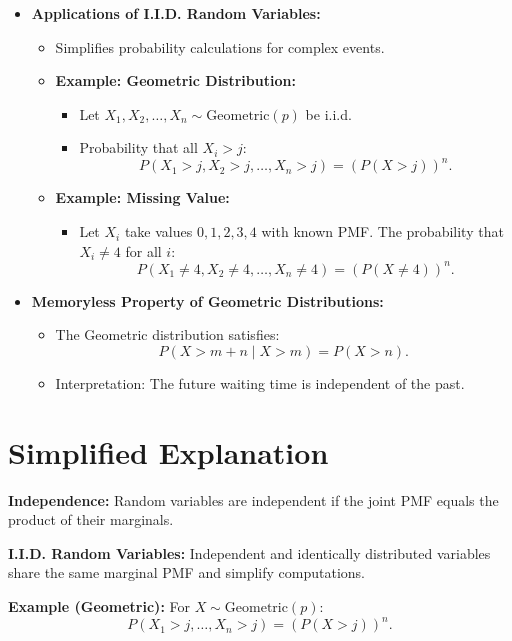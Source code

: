 \documentclass{article}
\begin{document}
\begin{itemize}
  \item \textbf{Applications of I.I.D. Random Variables:}
    \begin{itemize}
      \item Simplifies probability calculations for complex events.
      \item \textbf{Example: Geometric Distribution:}
        \begin{itemize}
          \item Let $X_1, X_2, \dots, X_n \sim \text{Geometric}(p)$ be i.i.d.
          \item Probability that all $X_i > j$:
            \[
              P(X_1 > j, X_2 > j, \dots, X_n > j) = \left(P(X > j)\right)^n.
            \]
        \end{itemize}
      \item \textbf{Example: Missing Value:}
        \begin{itemize}
          \item Let $X_i$ take values $0, 1, 2, 3, 4$ with known PMF. The probability that $X_i \neq 4$ for all $i$:
            \[
              P(X_1 \neq 4, X_2 \neq 4, \dots, X_n \neq 4) = \left(P(X \neq 4)\right)^n.
            \]
        \end{itemize}
    \end{itemize}

  \item \textbf{Memoryless Property of Geometric Distributions:}
    \begin{itemize}
      \item The Geometric distribution satisfies:
        \[
          P(X > m + n \mid X > m) = P(X > n).
        \]
      \item Interpretation: The future waiting time is independent of the past.
    \end{itemize}
\end{itemize}

\section*{Simplified Explanation}

\textbf{Independence:}
Random variables are independent if the joint PMF equals the product of their marginals.

\textbf{I.I.D. Random Variables:}
Independent and identically distributed variables share the same marginal PMF and simplify computations.

\textbf{Example (Geometric):}
For $X \sim \text{Geometric}(p)$:
\[
  P(X_1 > j, \dots, X_n > j) = \left(P(X > j)\right)^n.
\]
\end{document}
